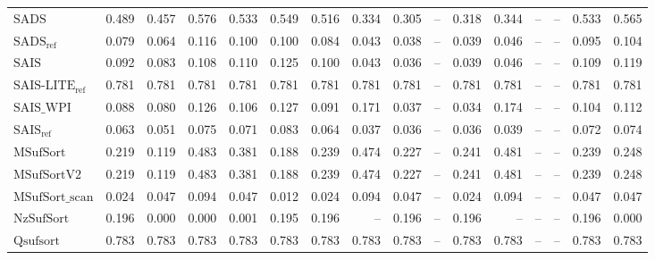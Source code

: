 \begin{table}[h]
{\begin{tabular}{lrrrrrrrrrrrrrrr}
    $\text{SADS}$ & 0.489 & 0.457 & 0.576 & 0.533 & 0.549 & 0.516 & 0.334 & 0.305 & {\color{darkgray}--} & 0.318 & 0.344 & {\color{darkgray}--} & {\color{darkgray}--} & 0.533 & 0.565 \\
    $\text{SADS}_{\text{ref}}$ & 0.079 & 0.064 & 0.116 & 0.100 & 0.100 & 0.084 & 0.043 & 0.038 & {\color{darkgray}--} & 0.039 & 0.046 & {\color{darkgray}--} & {\color{darkgray}--} & 0.095 & 0.104 \\
    $\text{SAIS}$ & 0.092 & 0.083 & 0.108 & 0.110 & 0.125 & 0.100 & 0.043 & 0.036 & {\color{darkgray}--} & 0.039 & 0.046 & {\color{darkgray}--} & {\color{darkgray}--} & 0.109 & 0.119 \\
    $\text{SAIS-LITE}_{\text{ref}}$ & 0.781 & 0.781 & 0.781 & 0.781 & 0.781 & 0.781 & 0.781 & 0.781 & {\color{darkgray}--} & 0.781 & 0.781 & {\color{darkgray}--} & {\color{darkgray}--} & 0.781 & 0.781 \\
    $\text{SAIS\_WPI}$ & 0.088 & 0.080 & 0.126 & 0.106 & 0.127 & 0.091 & 0.171 & 0.037 & {\color{darkgray}--} & 0.034 & 0.174 & {\color{darkgray}--} & {\color{darkgray}--} & 0.104 & 0.112 \\
    $\text{SAIS}_{\text{ref}}$ & 0.063 & 0.051 & 0.075 & 0.071 & 0.083 & 0.064 & 0.037 & 0.036 & {\color{darkgray}--} & 0.036 & 0.039 & {\color{darkgray}--} & {\color{darkgray}--} & 0.072 & 0.074 \\
    $\text{MSufSort}$ & 0.219 & 0.119 & 0.483 & 0.381 & 0.188 & 0.239 & 0.474 & 0.227 & {\color{darkgray}--} & 0.241 & 0.481 & {\color{darkgray}--} & {\color{darkgray}--} & 0.239 & 0.248 \\
    $\text{MSufSortV2}$ & 0.219 & 0.119 & 0.483 & 0.381 & 0.188 & 0.239 & 0.474 & 0.227 & {\color{darkgray}--} & 0.241 & 0.481 & {\color{darkgray}--} & {\color{darkgray}--} & 0.239 & 0.248 \\
    $\text{MSufSort\_scan}$ & 0.024 & 0.047 & 0.094 & 0.047 & 0.012 & 0.024 & 0.094 & 0.047 & {\color{darkgray}--} & 0.024 & 0.094 & {\color{darkgray}--} & {\color{darkgray}--} & 0.047 & 0.047 \\
    $\text{NzSufSort}$ & 0.196 & {\color{green!60!black}0.000} & {\color{green!60!black}0.000} & 0.001 & 0.195 & 0.196 & {\color{darkgray}--} & 0.196 & {\color{darkgray}--} & 0.196 & {\color{darkgray}--} & {\color{darkgray}--} & {\color{darkgray}--} & 0.196 & 0.000 \\
    $\text{Qsufsort}$ & 0.783 & 0.783 & 0.783 & 0.783 & 0.783 & 0.783 & 0.783 & 0.783 & {\color{darkgray}--} & 0.783 & 0.783 & {\color{darkgray}--} & {\color{darkgray}--} & 0.783 & 0.783 \\

\end{tabular}}
\end{table}
